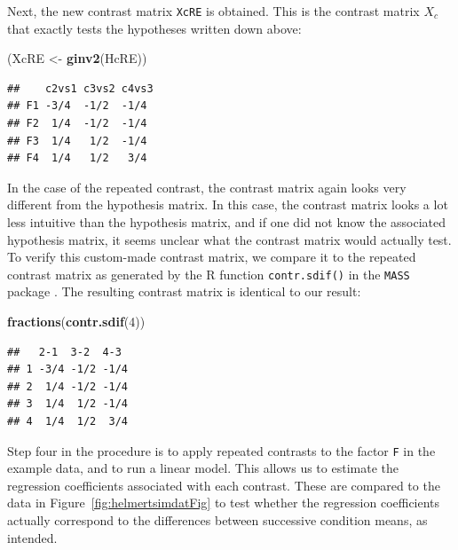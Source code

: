 \documentclass[12pt,]{krantz}
\newenvironment{Shaded}{\begin{snugshade}}{\end{snugshade}}
\newcommand{\DataTypeTok}[1]{\textcolor[rgb]{0.13,0.29,0.53}{#1}}
\newcommand{\DecValTok}[1]{\textcolor[rgb]{0.00,0.00,0.81}{#1}}
\newcommand{\KeywordTok}[1]{\textcolor[rgb]{0.13,0.29,0.53}{\textbf{#1}}}
\newcommand{\NormalTok}[1]{#1}
\newcommand{\OperatorTok}[1]{\textcolor[rgb]{0.81,0.36,0.00}{\textbf{#1}}}
\newcommand{\StringTok}[1]{\textcolor[rgb]{0.31,0.60,0.02}{#1}}
\begin{document}
Next, the new contrast matrix \texttt{XcRE} is obtained. This is the contrast matrix \(X_c\) that exactly tests the hypotheses written down above:

\begin{Shaded}
\begin{Highlighting}[]
\NormalTok{(XcRE <-}\StringTok{ }\KeywordTok{ginv2}\NormalTok{(HcRE))}
\end{Highlighting}
\end{Shaded}

\begin{verbatim}
##    c2vs1 c3vs2 c4vs3
## F1 -3/4  -1/2  -1/4 
## F2  1/4  -1/2  -1/4 
## F3  1/4   1/2  -1/4 
## F4  1/4   1/2   3/4
\end{verbatim}

In the case of the repeated contrast, the contrast matrix again looks very different from the hypothesis matrix. In this case, the contrast matrix looks a lot less intuitive than the hypothesis matrix, and if one did not know the associated hypothesis matrix, it seems unclear what the contrast matrix would actually test. To verify this custom-made contrast matrix, we compare it to the repeated contrast matrix as generated by the R function \texttt{contr.sdif()} in the \texttt{MASS} package \citep{R-MASS}. The resulting contrast matrix is identical to our result:

\begin{Shaded}
\begin{Highlighting}[]
\KeywordTok{fractions}\NormalTok{(}\KeywordTok{contr.sdif}\NormalTok{(}\DecValTok{4}\NormalTok{))}
\end{Highlighting}
\end{Shaded}

\begin{verbatim}
##   2-1  3-2  4-3 
## 1 -3/4 -1/2 -1/4
## 2  1/4 -1/2 -1/4
## 3  1/4  1/2 -1/4
## 4  1/4  1/2  3/4
\end{verbatim}

Step four in the procedure is to apply repeated contrasts to the factor \texttt{F} in the example data, and to run a linear model. This allows us to estimate the regression coefficients associated with each contrast. These are compared to the data in Figure~\ref{fig:helmertsimdatFig} to test whether the regression coefficients actually correspond to the differences between successive condition means, as intended.

\begin{Shaded}
\end{Shaded}
\end{document}
